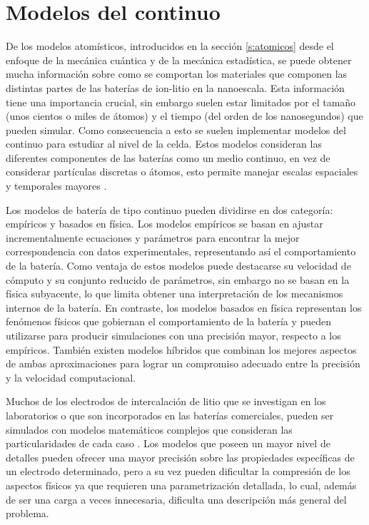 \section{Modelos del continuo}

De los modelos atomísticos, introducidos en la sección \ref{s:atomicos} desde 
el enfoque de la mecánica cuántica y de la mecánica estadística, se puede obtener
mucha información sobre como se comportan los materiales que componen las
distintas partes de las baterías de ion-litio en la nanoescala. Esta información 
tiene una importancia crucial, sin embargo suelen estar limitados por el tamaño
(unos cientos o miles de átomos) y el tiempo (del orden de los nanosegundos) que 
pueden simular. Como consecuencia a esto se suelen implementar modelos del 
continuo para estudiar al nivel de la celda. Estos modelos consideran las 
diferentes componentes de las baterías como un medio continuo, en vez de 
considerar partículas discretas o átomos, esto permite manejar escalas espaciales 
y temporales mayores \cite{brosa2022}.

Los modelos de batería de tipo continuo pueden dividirse en dos categoría:
empíricos y basados en física. Los modelos empíricos se basan en ajustar 
incrementalmente ecuaciones y parámetros para encontrar la mejor correspondencia
con datos experimentales, representando así el comportamiento de la batería. 
Como ventaja de estos modelos puede destacarse su velocidad de cómputo y su
conjunto reducido de parámetros, sin embargo no se basan en la física subyacente, 
lo que limita obtener una interpretación de los mecanismos internos de la batería.
En contraste, los modelos basados en física representan los fenómenos físicos 
que gobiernan el comportamiento de la batería y pueden utilizarse para producir 
simulaciones con una precisión mayor, respecto a los empíricos. También existen
modelos híbridos que combinan los mejores aspectos de ambas aproximaciones para 
lograr un compromiso adecuado entre la precisión y la velocidad computacional.

Muchos de los electrodos de intercalación de litio que se investigan en los 
laboratorios o que son incorporados en las baterías comerciales, pueden ser 
simulados con modelos matemáticos complejos que consideran las particularidades 
de cada caso \cite{doyle1995}. Los modelos que poseen un mayor nivel de detalles 
pueden ofrecer una mayor precisión sobre las propiedades 
específicas de un electrodo determinado, pero a su vez pueden dificultar la 
compresión de los aspectos físicos ya que requieren una parametrización detallada, 
lo cual, además de ser una carga a veces innecesaria, dificulta una descripción 
más general del problema. 


